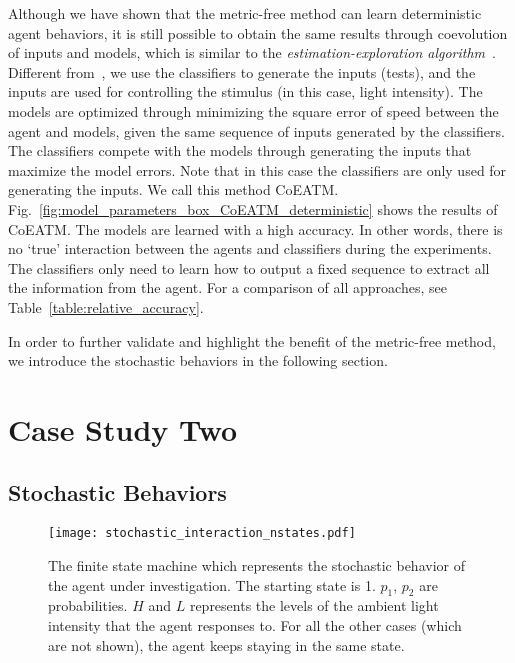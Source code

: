 Although we have shown that the metric-free method can learn deterministic agent behaviors, it is still possible to obtain the same results through coevolution of inputs and models, which is similar to the \textit{estimation-exploration algorithm}~\cite{Bongard2005_tevc}. Different from~\cite{Bongard2005_tevc}, we use the classifiers to generate the inputs (tests), and the inputs are used for controlling the stimulus (in this case, light intensity). The models are optimized through minimizing the square error of speed between the agent and models, given the same sequence of inputs generated by the classifiers. The classifiers compete with the models through generating the inputs that maximize the model errors. Note that in this case the classifiers are only used for generating the inputs. We call this method CoEATM. Fig.~\ref{fig:model_parameters_box_CoEATM_deterministic} shows the results of CoEATM. The models are learned with a high accuracy. In other words, there is no `true' interaction between the agents and classifiers during the experiments. The classifiers only need to learn how to output a fixed sequence to extract all the information from the agent. For a comparison of all approaches, see Table~\ref{table:relative_accuracy}. 

In order to further validate and highlight the benefit of the metric-free method, we introduce the stochastic behaviors in the following section. 

\section{Case Study Two}

\subsection{Stochastic Behaviors}\label{sec:stochastic_behavior_interaction}

\begin{figure}[!t]
\centering
\texttt{[image: stochastic\_interaction\_nstates.pdf]}
\caption{The finite state machine which represents the stochastic behavior of the agent under investigation. The starting state is 1. $p_1$, $p_2$ are probabilities. $H$ and $L$ represents the levels of the ambient light intensity that the agent responses to. For all the other cases (which are not shown), the agent keeps staying in the same state.}
\label{fig:stochastic_behavior_n_states} 
\end{figure}

